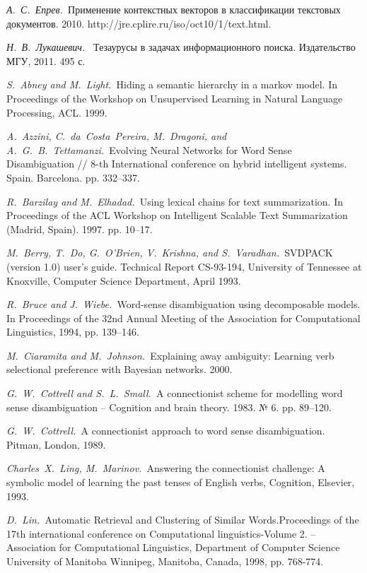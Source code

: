 \documentclass{article}
\begin{document}
\begin{articletext}
\begin{thebibliography}{9}
\textit{А.~С.~Епрев.~}Применение контекстных векторов в классификации текстовых документов. 2010. http://jre.cplire.ru/iso/oct10/1/text.html.

\textit{Н.~В.~Лукашевич.~} Тезаурусы в задачах информационного поиска. Издательство МГУ, 2011. 495 с.

\textit{S.~Abney and M.~Light.~}Hiding a semantic hierarchy in a markov model. In Proceedings of the Workshop on Unsupervised Learning in Natural Language Processing, ACL. 1999.

\textit{A.~Azzini, C.~da~Costa~Pereira, M.~Dragoni, and A.~G.~B.~Tettamanzi.~}Evolving Neural Networks for Word Sense Disambiguation // 8-th International conference on hybrid intelligent systems. Spain. Barcelona. pp. 332–337.

\textit{R.~Barzilay and M.~Elhadad.~}Using lexical chains for text summarization. In Proceedings of the ACL Workshop on Intelligent Scalable Text Summarization (Madrid, Spain). 1997. pp. 10–17.

\textit{M.~Berry, T.~Do, G.~O’Brien, V.~Krishna, and S.~Varadhan.~}SVDPACK (version 1.0) user’s guide. Technical Report CS-93-194, University of Tennessee at Knoxville, Computer Science Department, April 1993.

\textit{R.~Bruce and J.~Wiebe.~}Word-sense disambiguation using decomposable models. In Proceedings of the 32nd Annual Meeting of the Association for Computational Linguistics, 1994, pp. 139–146.

\textit{M.~Ciaramita and M.~Johnson.~}Explaining away ambiguity: Learning verb selectional preference with Bayesian networks. 2000. 

\textit{G.~W.~Cottrell and S.~L.~Small.~}A connectionist  scheme for modelling word  sense  disambiguation -- Cognition and brain theory. 1983. № 6. pp. 89–120. 

\textit{G.~W.~Cottrell.~}A connectionist approach to word sense disambiguation. Pitman, London, 1989.

\textit{Charles~X.~Ling, M.~Marinov.~}Answering the connectionist challenge: A symbolic model of learning the past tenses of English verbs,  Cognition, Elsevier, 1993.

\textit{D.~Lin.~}Automatic Retrieval and Clustering of Similar Words.Proceedings of the 17th international conference on Computational linguistics-Volume 2. – Association for Computational Linguistics, Department of Computer Science University of Manitoba Winnipeg, Manitoba, Canada, 1998, pp. 768-774.


\end{thebibliography}
\end{articletext}
\end{document}
